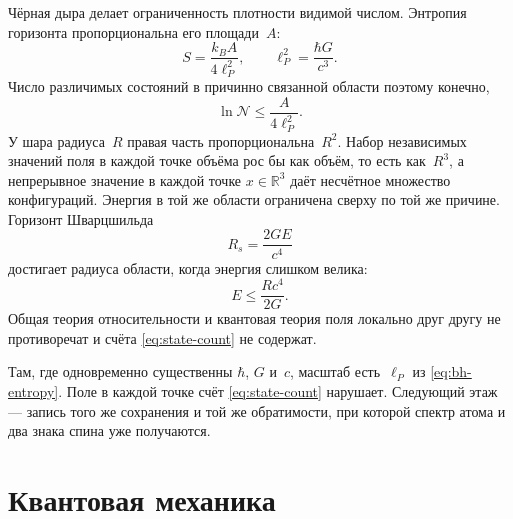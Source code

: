 Чёрная дыра делает ограниченность плотности видимой числом.
Энтропия горизонта пропорциональна его площади~$A$:
\begin{equation}
  S = \frac{k_B A}{4\ell_P^2},
  \qquad
  \ell_P^2 = \frac{\hbar G}{c^3}.
  \label{eq:bh-entropy}
\end{equation}
Число различимых состояний в причинно связанной области поэтому конечно,
\begin{equation}
  \ln\mathcal{N} \le \frac{A}{4\ell_P^2}.
  \label{eq:state-count}
\end{equation}
У шара радиуса~$R$ правая часть пропорциональна~$R^2$.
Набор независимых значений поля в каждой точке объёма рос бы как объём, то есть как~$R^3$,
а непрерывное значение в каждой точке $x\in\mathbb{R}^3$ даёт несчётное множество конфигураций.
Энергия в той же области ограничена сверху по той же причине.
Горизонт Шварцшильда
\begin{equation}
  R_s = \frac{2GE}{c^4}
  \label{eq:schwarzschild}
\end{equation}
достигает радиуса области, когда энергия слишком велика:
\begin{equation}
  E \le \frac{R c^4}{2G}.
  \label{eq:energy-bound}
\end{equation}
Общая теория относительности и квантовая теория поля локально друг другу не противоречат
и счёта \eqref{eq:state-count} не содержат.

Там, где одновременно существенны $\hbar$, $G$ и~$c$, масштаб есть~$\ell_P$ из \eqref{eq:bh-entropy}.
Поле в каждой точке счёт \eqref{eq:state-count} нарушает.
Следующий этаж --- запись того же сохранения и той же обратимости,
при которой спектр атома и два знака спина уже получаются.

\section{Квантовая механика}
\label{sec:qm}

